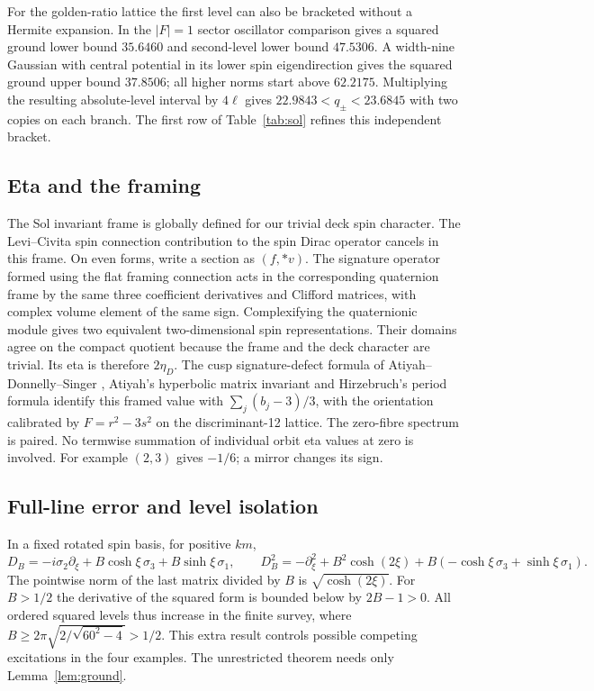 For the golden-ratio lattice the first level can also be bracketed without a Hermite expansion. In the \(|F|=1\) sector oscillator comparison gives a squared ground lower bound \(35.6460\) and second-level lower bound \(47.5306\). A width-nine Gaussian with central potential in its lower spin eigendirection gives the squared ground upper bound \(37.8506\); all higher norms start above \(62.2175\). Multiplying the resulting absolute-level interval by \(4\ell\) gives \(22.9843<q_\pm<23.6845\) with two copies on each branch. The first row of Table~\ref{tab:sol} refines this independent bracket.

\subsection{Eta and the framing}
The Sol invariant frame is globally defined for our trivial deck spin character. The Levi--Civita spin connection contribution to the spin Dirac operator cancels in this frame. On even forms, write a section as \((f,*v)\). The signature operator formed using the flat framing connection acts in the corresponding quaternion frame by the same three coefficient derivatives and Clifford matrices, with complex volume element of the same sign. Complexifying the quaternionic module gives two equivalent two-dimensional spin representations. Their domains agree on the compact quotient because the frame and the deck character are trivial. Its eta is therefore \(2\eta_D\). The cusp signature-defect formula of Atiyah--Donnelly--Singer \cite{ads}, Atiyah's hyperbolic matrix invariant \cite{atiyah} and Hirzebruch's period formula \cite{hirz} identify this framed value with \(\sum_j(b_j-3)/3\), with the orientation calibrated by \(F=r^2-3s^2\) on the discriminant-12 lattice. The zero-fibre spectrum is paired. No termwise summation of individual orbit eta values at zero is involved. For example \((2,3)\) gives \(-1/6\); a mirror changes its sign.

\subsection{Full-line error and level isolation}
In a fixed rotated spin basis, for positive \(km\),
\[
 D_B=-i\sigma_2\partial_\xi+B\cosh\xi\,\sigma_3+B\sinh\xi\,\sigma_1,\qquad
 D_B^2=-\partial_\xi^2+B^2\cosh(2\xi)+B(-\cosh\xi\,\sigma_3+\sinh\xi\,\sigma_1).
\]
The pointwise norm of the last matrix divided by \(B\) is \(\sqrt{\cosh(2\xi)}\). For \(B>1/2\) the derivative of the squared form is bounded below by \(2B-1>0\). All ordered squared levels thus increase in the finite survey, where \(B\ge2\pi\sqrt{2/\sqrt{60^2-4}}>1/2\). This extra result controls possible competing excitations in the four examples. The unrestricted theorem needs only Lemma~\ref{lem:ground}.

